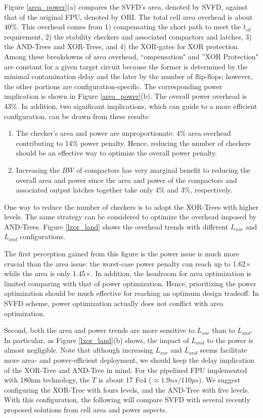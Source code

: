 Figure \ref{area_power}(a) compares the SVFD's area, denoted by SVFD, against that of the original FPU, denoted by ORI. The total cell area overhead is about 40\%. This overhead comes from 1) compensating the short path to meet the $t_{cd}$ requirement, 2) the stability checkers and associated compactors  and latches, 3) the AND-Trees and XOR-Trees, and 4) the XOR-gates for XOR protection. Among these breakdowns of area overhead, “ompensation" and ”XOR Protection" are constant for a given target circuit because the former is determined by the minimal contamination delay and the later by the number of flip-flops; however, the other portions are configuration-specific. The corresponding power implication is shown in Figure \ref{area_power}(b). The overall power overhead is 43\%. In addition, two significant implications, which can guide to a more efficient configuration, can be drawn from these results:
\begin{enumerate}
  \item  The checker's area and power are unproportionate:  4\% area overhead   contributing to 14\% power penalty. Hence, reducing the number of checkers should   be an effective way to optimize the  overall power penalty.

  \item  Increasing the $BW$ of compactors has very marginal benefit to reducing the overall area and power since the area and power of the compactors and associated output latches together take only 4\% and 3\%, respectively.
\end{enumerate}

One way to reduce the number of checkers is to adopt the XOR-Trees with higher levels. The same strategy can be considered to optimize the overhead imposed by AND-Trees. Figure \ref{lxor_land} shows the overhead trends with different $L_{xor}$ and $L_{and}$ configurations.

The first perception gained from this figure is the power issue is much more crucial than the area issue: the worst-case power penalty can reach up to 1.62$\times$ while the area is only 1.45$\times$. In addition, the headroom for area optimization is limited comparing with that of power optimization. Hence, prioritizing the power optimization should be much effective for reaching an optimum design tradeoff. In SVFD scheme, power optimization actually does not conflict with area optimization.

Second, both the area and power trends are more sensitive to $L_{xor}$ than to $L_{and}$. In particular, as Figure \ref{lxor_land}(b) shows, the impact of $L_{and}$ to the power is almost negligible. Note that although increasing $L_{xor}$ and $L_{and}$ seems facilitate more area- and power-efficient deployment, we should keep the delay implication of the XOR-Tree and AND-Tree in mind. For the pipelined FPU implemented with 180nm technology, the $T$ is about 17 Fo4 ($\approx 1.9ns/110ps$). We suggest configuring the XOR-Tree with fours levels, and the AND-Tree with five levels. With this configuration, the following will compare SVFD with several recently proposed solutions from cell area and power aspects.


